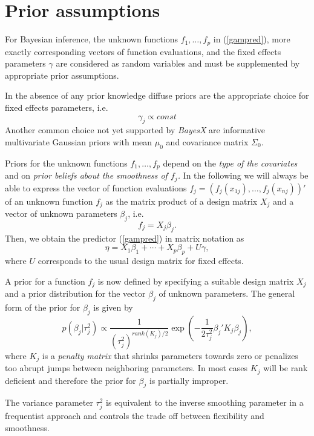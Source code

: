 \section{Prior assumptions}
\label{priorassumptions}

For Bayesian inference, the unknown functions $f_{1},\dots ,f_{p}$
in (\ref{gampred}), more exactly corresponding vectors of function
evaluations, and the fixed effects parameters $\gamma$ are
considered as random variables and must be supplemented by
appropriate prior assumptions.

In the absence of any prior knowledge diffuse priors are the
appropriate choice for fixed effects parameters, i.e.
$$
\gamma_j \propto const
$$
Another common choice not yet supported by {\em BayesX} are
informative multivariate Gaussian priors with mean $\mu_0$ and
covariance matrix $\Sigma_0$.


Priors for the unknown functions $f_{1},\dots,f_{p}$ depend on the
{\em type of the covariates} and on {\em prior beliefs about the
smoothness of $f_j$.} In the following we will always be able to
express the vector of function evaluations
$f_j=(f_j(x_{1j}),\dots,f_j(x_{nj}))'$ of an unknown function
$f_j$ as the matrix product of a design matrix $X_j$ and a vector
of unknown parameters $\beta_j$, i.e.
\begin{equation}
\label{matproduct} f_j=X_j \beta_j.
\end{equation}
Then, we obtain the predictor (\ref{gampred}) in matrix notation
as
\begin{equation}
\label{gampredmatrix} \eta = X_1 \beta_1 + \cdots + X_p \beta_p +
U \gamma,
\end{equation}
where $U$ corresponds to the usual design matrix for fixed
effects.

A prior for a function $f_j$ is now defined by specifying a
suitable design matrix $X_j$ and a prior distribution for the
vector $\beta_j$ of unknown parameters. The general form of the
prior for $\beta_j$ is given by
\begin{equation}
\label{genform} p(\beta_j | \tau_j^2) \propto
\frac{1}{(\tau^2_j)^{rank(K_j)/2}} \exp\left(-\frac{1}{2\tau_j^2}
\beta_j' K_j \beta_j\right),
\end{equation}
where $K_j$ is a {\em penalty matrix} that shrinks parameters
towards zero or penalizes too abrupt jumps between neighboring
parameters. In most cases $K_j$ will be rank deficient and
therefore the prior for $\beta_j$ is partially improper.

The variance parameter $\tau_j^2$ is  equivalent to the inverse
smoothing parameter in a frequentist approach and controls the
trade off between flexibility and smoothness.

